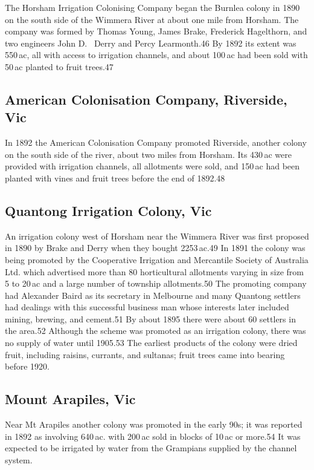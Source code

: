 The Horsham Irrigation Colonising Company began the Burnlea colony in
1890 on the south side of the Wimmera River at about one mile from
Horsham. The company was formed by Thomas Young, James Brake,
Frederick Hagelthorn, and two engineers John D.~ Derry and Percy
Learmonth.46 By 1892 its extent was 550\,ac, all with access to
irrigation channels, and about 100\,ac had been sold with 50\,ac
planted to fruit trees.47

\subsection{American Colonisation Company, Riverside, Vic}

In 1892 the American Colonisation Company promoted Riverside, another
colony on the south side of the river, about two miles from Horsham.
Its 430\,ac were provided with irrigation channels, all allotments
were sold, and 150\,ac had been planted with vines and fruit trees
before the end of 1892.48

\subsection{Quantong Irrigation Colony, Vic}

An irrigation colony west of Horsham near the Wimmera River was first
proposed in 1890 by Brake and Derry when they bought 2253\,ac.49 In
1891 the colony was being promoted by the Cooperative Irrigation and
Mercantile Society of Australia Ltd. which advertised more than 80
horticultural allotments varying in size from 5 to 20\,ac and a large
number of township allotments.50 The promoting company had Alexander
Baird as its secretary in Melbourne and many Quantong settlers had
dealings with this successful business man whose interests later
included mining, brewing, and cement.51 By about 1895 there were about
60 settlers in the area.52 Although the scheme was promoted as an
irrigation colony, there was no supply of water until 1905.53 The
earliest products of the colony were dried fruit, including raisins,
currants, and sultanas; fruit trees came into bearing before 1920.

\subsection{Mount Arapiles, Vic}

Near Mt Arapiles another colony was promoted in the early 90s; it was
reported in 1892 as involving 640\,ac. with 200\,ac sold in blocks of
10\,ac or more.54 It was expected to be irrigated by water from the
Grampians supplied by the channel system.

